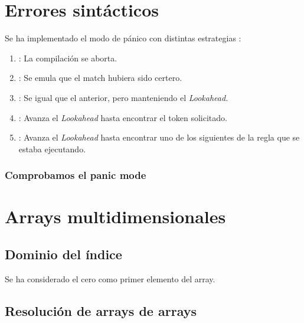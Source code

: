 \clearpage

\section{Errores sintácticos}

	Se ha implementado el modo de pánico con distintas estrategias :
	
	\begin{enumerate}
	
		\item {} : La compilación se aborta.
		
		\item {} : Se emula que el match hubiera sido certero.
		
		\item {} : Se igual que el anterior, pero manteniendo el \emph{Lookahead}.
		
		\item {} : Avanza el \emph{Lookahead} hasta encontrar el token solicitado.
		
		\item {} : Avanza el \emph{Lookahead} hasta encontrar uno de los siguientes de la regla que se estaba ejecutando.
		
	\end{enumerate}

		\subsubsection*{Comprobamos el panic mode}
		
		
		

\clearpage

\section{Arrays multidimensionales}

	\subsection{Dominio del índice}
	
		Se ha considerado el cero como primer elemento del array.
		
	\subsection{Resolución de arrays de arrays}
	
